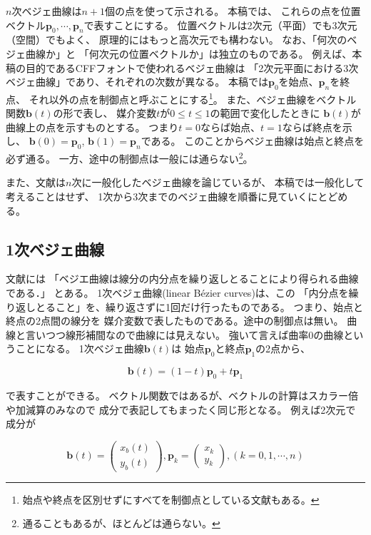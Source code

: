 \documentclass[dvipdfmx]{jsarticle}
\newcommand\VectBold[1]{\boldsymbol{#1}}
\newcommand\VectBold[1]{\symbf{#1}}
\newcommand\Vect[1]{\VectBold{#1}}
\begin{document}
$n$次ベジェ曲線は$n+1$個の点を使って示される。
本稿では、
これらの点を位置ベクトル$\Vect{p}_0, \cdots, \Vect{p}_n$で表すことにする。
位置ベクトルは2次元（平面）でも3次元（空間）でもよく、
原理的にはもっと高次元でも構わない。
なお、「何次のベジェ曲線か」と
「何次元の位置ベクトルか」は独立のものである。
例えば、本稿の目的であるCFFフォントで使われるベジェ曲線は
「2次元平面における3次ベジェ曲線」であり、それぞれの次数が異なる。
本稿では$\Vect{p}_0$を始点、$\Vect{p}_n$を終点、
それ以外の点を制御点と呼ぶことにする\footnote{%
始点や終点を区別せずにすべてを制御点としている文献もある。}。
また、ベジェ曲線をベクトル関数$\Vect{b}\left(t\right)$の形で表し、
媒介変数$t$が$0 \leq t \leq 1$の範囲で変化したときに
$\Vect{b}\left(t\right)$が曲線上の点を示すものとする。
つまり$t=0$ならば始点、$t=1$ならば終点を示し、
$\Vect{b}\left(0\right)=\Vect{p}_0$,
$\Vect{b}\left(1\right)=\Vect{p}_n$である。
このことからベジェ曲線は始点と終点を必ず通る。
一方、途中の制御点は一般には通らない\footnote{%
  通ることもあるが、ほとんどは通らない。}。

また、文献\cite{sakane}は$n$次に一般化したベジェ曲線を論じているが、
本稿では一般化して考えることはせず、
1次から3次までのベジェ曲線を順番に見ていくにとどめる。

\subsection{1次ベジェ曲線}

文献\cite{sakane}には
「ベジエ曲線は線分の内分点を繰り返しとることにより得られる曲線である．」
とある。
1次ベジェ曲線(linear Bézier curves)は、この
「内分点を繰り返しとること」を、繰り返さずに1回だけ行ったものである。
つまり、始点と終点の2点間の線分を
媒介変数で表したものである。途中の制御点は無い。
曲線と言いつつ線形補間なので曲線には見えない。
強いて言えば曲率0の曲線ということになる。
1次ベジェ曲線$\Vect{b}\left(t\right)$は
始点$\Vect{p}_0$と終点$\Vect{p}_1$の2点から、

\begin{equation}
  \Vect{b}\left(t\right)=\left(1-t\right)\Vect{p}_0 + t\Vect{p}_1
  \label{eq:linear}
\end{equation}

で表すことができる。
ベクトル関数ではあるが、ベクトルの計算はスカラー倍や加減算のみなので
成分で表記してもまったく同じ形となる。
例えば2次元で成分が

\begin{equation}
  \Vect{b}\left(t\right) =
  \begin{pmatrix}
    x_b\left(t\right) \\
    y_b\left(t\right)
  \end{pmatrix}
  ,
  \Vect{p}_k =
  \begin{pmatrix}
    x_k \\
    y_k
  \end{pmatrix}
  ,
  \left(k=0,1,\cdots,n\right)
  \label{eq:component}
\end{equation}
\end{document}

